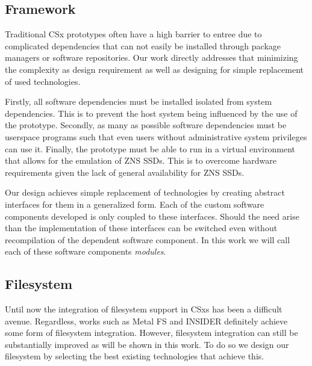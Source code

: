 \subsection{Framework}

Traditional CSx prototypes often have a high barrier to entree due to
complicated dependencies that can not easily be installed through package
managers or software repositories. Our work directly addresses that minimizing
the complexity as design requirement as well as designing for simple
replacement of used technologies.

Firstly, all software dependencies must be installed isolated from system
dependencies. This is to prevent the host system being influenced by the use
of the prototype. Secondly, as many as possible software dependencies must be
userspace programs such that even users without administrative system
privileges can use it. Finally, the prototype must be able to run in a virtual
environment that allows for the emulation of ZNS SSDs. This is to overcome
hardware requirements given the lack of general availability for ZNS SSDs.

Our design achieves simple replacement of technologies by creating abstract
interfaces for them in a generalized form. Each of the custom software
components developed is only coupled to these interfaces. Should the need arise
than the implementation of these interfaces can be switched even without
recompilation of the dependent software component. In this work we will call
each of these software components \textit{modules}.

\subsection{Filesystem}

Until now the integration of filesystem support in CSxs has been a difficult
avenue. Regardless, works such as Metal FS \cite{10.1145/3415580} and INSIDER
\cite{234968} definitely achieve some form of filesystem integration. However,
filesystem integration can still be substantially improved as will be shown in
this work. To do so we design our filesystem by selecting the best existing
technologies that achieve this.

